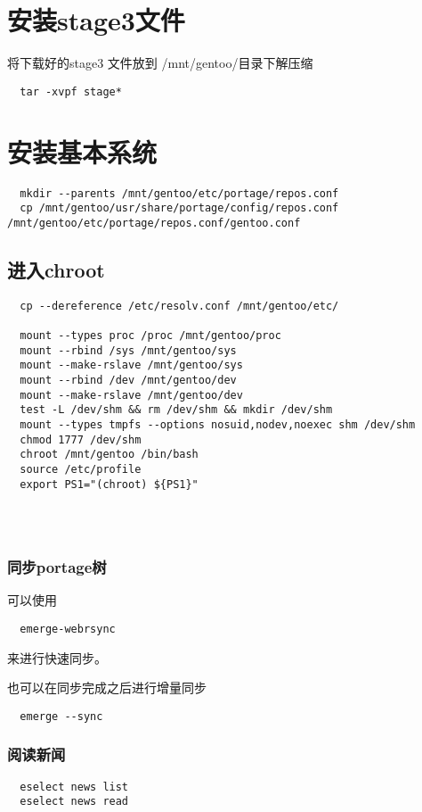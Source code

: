 \documentclass{book}
\begin{document}
\chapter{安装stage3文件}

将下载好的stage3 文件放到 /mnt/gentoo/目录下解压缩

\begin{lstlisting}
  tar -xvpf stage*
\end{lstlisting}

\chapter{安装基本系统}

\begin{lstlisting}
  mkdir --parents /mnt/gentoo/etc/portage/repos.conf
  cp /mnt/gentoo/usr/share/portage/config/repos.conf /mnt/gentoo/etc/portage/repos.conf/gentoo.conf
\end{lstlisting}

\section{进入chroot}
\begin{lstlisting}
  cp --dereference /etc/resolv.conf /mnt/gentoo/etc/

  mount --types proc /proc /mnt/gentoo/proc
  mount --rbind /sys /mnt/gentoo/sys
  mount --make-rslave /mnt/gentoo/sys
  mount --rbind /dev /mnt/gentoo/dev
  mount --make-rslave /mnt/gentoo/dev
  test -L /dev/shm && rm /dev/shm && mkdir /dev/shm
  mount --types tmpfs --options nosuid,nodev,noexec shm /dev/shm
  chmod 1777 /dev/shm
  chroot /mnt/gentoo /bin/bash
  source /etc/profile
  export PS1="(chroot) ${PS1}"


  
\end{lstlisting}

\subsection{同步portage树}
可以使用
\begin{lstlisting}
  emerge-webrsync
\end{lstlisting}
来进行快速同步。

也可以在同步完成之后进行增量同步

\begin{lstlisting}
  emerge --sync
\end{lstlisting}

\subsection{阅读新闻}
\begin{lstlisting}
  eselect news list
  eselect news read
\end{lstlisting}
\end{document}
